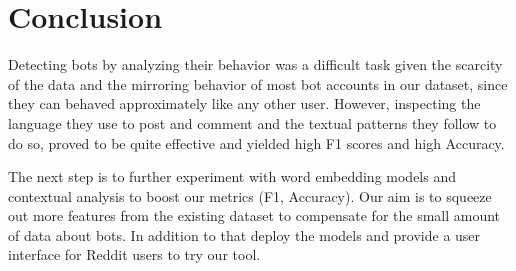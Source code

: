 \documentclass{article}
\begin{document}
 \section{Conclusion}
 Detecting bots by analyzing their behavior was a difficult task given the scarcity of the data and the mirroring behavior of most bot accounts in our dataset, since they can behaved approximately like any other user. However, inspecting the language they use to post and comment and the textual patterns they follow to do so, proved to be quite effective and yielded high F1 scores and high Accuracy. \par
 The next step is to further experiment with word embedding models and contextual analysis to boost our metrics (F1, Accuracy). Our aim is to squeeze out more features from the existing dataset to compensate for the small amount of data about bots. In addition to that deploy the models and provide a user interface for Reddit users to try our tool. \par
\end{document}
